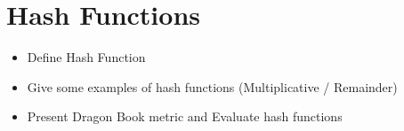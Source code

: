 \chapter{Hash Functions}
\label{cap:Hash Functions}

\begin{itemize}
\item Define Hash Function
\item Give some examples of hash functions (Multiplicative / Remainder)
\item Present Dragon Book metric and Evaluate hash functions
\end{itemize}